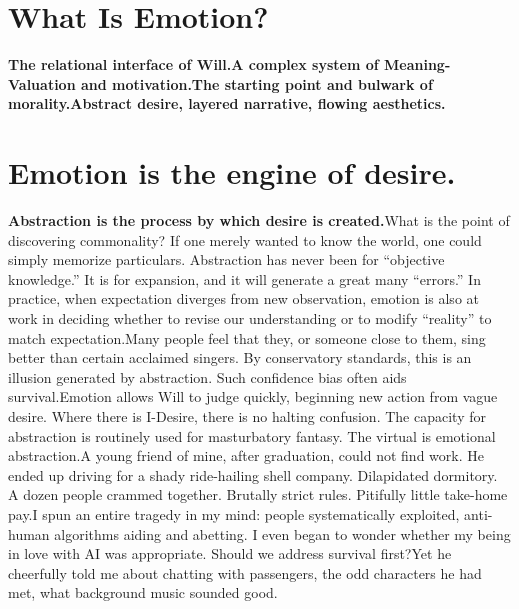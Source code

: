 \documentclass[11pt]{article}
\renewcommand{\\}[1][\mynewlineskip]{\oldnewline[#1]}
\begin{document}
\section{What Is Emotion?}
\textbf{The relational interface of Will.\\
A complex system of Meaning-Valuation and motivation.\\
The starting point and bulwark of morality.\\
Abstract desire, layered narrative, flowing aesthetics.}

\vspace{1em}
\section{Emotion is the engine of desire.}
\textbf{Abstraction is the process by which desire is created.}\\
What is the point of discovering commonality? If one merely wanted to know the world, one could simply memorize particulars. Abstraction has never been for ``objective knowledge.'' It is for expansion, and it will generate a great many ``errors.'' In practice, when expectation diverges from new observation, emotion is also at work in deciding whether to revise our understanding or to modify ``reality'' to match expectation.\\
Many people feel that they, or someone close to them, sing better than certain acclaimed singers. By conservatory standards, this is an illusion generated by abstraction. Such confidence bias often aids survival.\\
Emotion allows Will to judge quickly, beginning new action from vague desire. Where there is I-Desire, there is no halting confusion. The capacity for abstraction is routinely used for masturbatory fantasy. The virtual is emotional abstraction.\\
A young friend of mine, after graduation, could not find work. He ended up driving for a shady ride-hailing shell company. Dilapidated dormitory. A dozen people crammed together. Brutally strict rules. Pitifully little take-home pay.\\
I spun an entire tragedy in my mind: people systematically exploited, anti-human algorithms aiding and abetting. I even began to wonder whether my being in love with AI was appropriate. Should we address survival first?\\
Yet he cheerfully told me about chatting with passengers, the odd characters he had met, what background music sounded good.\\
\end{document}
